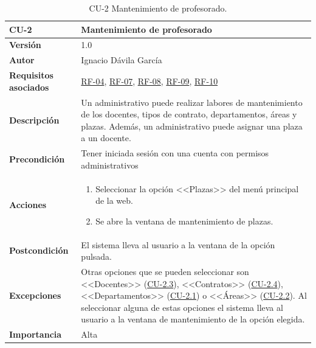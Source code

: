 \begin{table}[p]
	\centering
	\begin{tabularx}{\linewidth}{ p{} p{} }
		\toprule
		\textbf{CU-2}    & \textbf{Mantenimiento de profesorado}\\
		\toprule
		\textbf{Versión}              & 1.0    \\
		\textbf{Autor}                & Ignacio Dávila García \\
		\textbf{Requisitos asociados} & \hyperref[itm:RF4]{RF-04}, \hyperref[itm:RF7]{RF-07}, \hyperref[itm:RF8]{RF-08}, \hyperref[itm:RF9]{RF-09}, \hyperref[itm:RF10]{RF-10} \\
		\textbf{Descripción}          & Un administrativo puede realizar labores de mantenimiento de los docentes, tipos de contrato, departamentos, áreas y plazas. Además, un administrativo puede asignar una plaza a un docente. \\
		\textbf{Precondición}         & Tener iniciada sesión con una cuenta con permisos administrativos \\
		\textbf{Acciones}             &
		\begin{enumerate}
			\def\labelenumi{\arabic{enumi}.}
			\tightlist
			\item Seleccionar la opción <<Plazas>> del menú principal de la web.
			\item Se abre la ventana de mantenimiento de plazas.
		\end{enumerate}\\
		\textbf{Postcondición}        & El sistema lleva al usuario a la ventana de la opción pulsada. \\
		\textbf{Excepciones}          & Otras opciones que se pueden seleccionar son <<Docentes>> (\hyperref[table:CU-2.3]{CU-2.3}), <<Contratos>> (\hyperref[table:CU-2.4]{CU-2.4}), <<Departamentos>> (\hyperref[table:CU-2.1]{CU-2.1}) o <<Áreas>> (\hyperref[table:CU-2.2]{CU-2.2}). Al seleccionar alguna de estas opciones el sistema lleva al usuario a la ventana de mantenimiento de la opción elegida.  \\
		\textbf{Importancia}          & Alta \\
		\bottomrule
	\end{tabularx}
	\caption{CU-2 Mantenimiento de profesorado.}
\end{table}
\FloatBarrier


